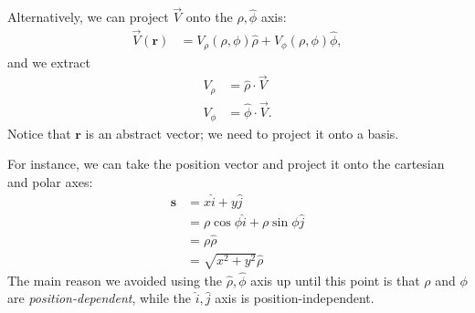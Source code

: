 \documentclass[10pt]{mypackage}
\begin{document}
Alternatively, we can project $ \vec{V} $ onto the $\hat\rho,\hat\phi$ axis:
\begin{align*}
  \vec{V}(\mathbf{r}) &= V_{\rho}\left(\rho,\phi\right)\hat{\rho} + V_{\phi}\left(\rho,\phi\right)\hat{\phi},
\end{align*}
and we extract
\begin{align*}
  V_{\rho} &= \hat{\rho}\cdot \vec{V}\\
  V_{\phi} &= \hat{\phi}\cdot \vec{V}.
\end{align*}
Notice that $\mathbf{r}$ is an abstract vector; we need to project it onto a basis.\newline

For instance, we can take the position vector and project it onto the cartesian and polar axes:
\begin{align*}
  \mathbf{s} &= x\hat{i} + y\hat{j}\\
             &= \rho \cos \phi \hat{i} + \rho \sin \phi \hat{j}\\
             &= \rho \hat{\rho}\\
             &= \sqrt{x^2 + y^2}\hat{\rho}
\end{align*}
The main reason we avoided using the $\hat\rho,\hat\phi$ axis up until this point is that $\rho$ and $\phi$ are \textit{position-dependent}, while the $\hat{i},\hat{j}$ axis is position-independent.\newline
\end{document}
